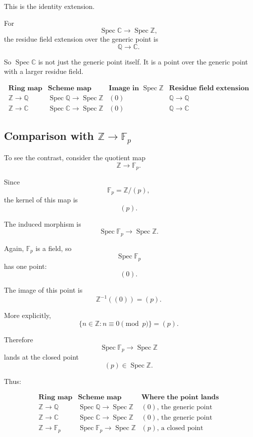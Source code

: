 \documentclass[12pt,a4paper]{article}
\DeclareMathOperator{\Spec}{Spec}
\theoremstyle{notespace}
\begin{document}
This is the identity extension.

For
\[
\Spec\mathbb C\to \Spec\mathbb Z,
\]
the residue field extension over the generic point is
\[
\mathbb Q\to \mathbb C.
\]

So \(\Spec\mathbb C\) is not just the generic point itself. It is a point over the generic point with a larger residue field.

\[
\begin{array}{c|c|c|c}
	\textbf{Ring map}
	&
	\textbf{Scheme map}
	&
	\textbf{Image in }\Spec\mathbb Z
	&
	\textbf{Residue field extension}
	\\
	\hline
	\mathbb Z\to \mathbb Q
	&
	\Spec\mathbb Q\to \Spec\mathbb Z
	&
	(0)
	&
	\mathbb Q\to \mathbb Q
	\\[5pt]
	\mathbb Z\to \mathbb C
	&
	\Spec\mathbb C\to \Spec\mathbb Z
	&
	(0)
	&
	\mathbb Q\to \mathbb C
\end{array}
\]

\subsection{Comparison with \texorpdfstring{\(\mathbb Z\to \mathbb F_p\)}{Z to Fp}}

To see the contrast, consider the quotient map
\[
\mathbb Z\to \mathbb F_p.
\]

Since
\[
\mathbb F_p=\mathbb Z/(p),
\]
the kernel of this map is
\[
(p).
\]

The induced morphism is
\[
\Spec\mathbb F_p\to \Spec\mathbb Z.
\]

Again, \(\mathbb F_p\) is a field, so
\[
\Spec\mathbb F_p
\]
has one point:
\[
(0).
\]

The image of this point is
\[
\mathbb Z^{-1}((0))=(p).
\]

More explicitly,
\[
\{n\in\mathbb Z:n\equiv 0\pmod p\}=(p).
\]

Therefore
\[
\Spec\mathbb F_p\to \Spec\mathbb Z
\]
lands at the closed point
\[
(p)\in\Spec\mathbb Z.
\]

Thus:

\[
\begin{array}{c|c|c}
	\textbf{Ring map}
	&
	\textbf{Scheme map}
	&
	\textbf{Where the point lands}
	\\
	\hline
	\mathbb Z\to \mathbb Q
	&
	\Spec\mathbb Q\to \Spec\mathbb Z
	&
	(0)\text{, the generic point}
	\\[5pt]
	\mathbb Z\to \mathbb C
	&
	\Spec\mathbb C\to \Spec\mathbb Z
	&
	(0)\text{, the generic point}
	\\[5pt]
	\mathbb Z\to \mathbb F_p
	&
	\Spec\mathbb F_p\to \Spec\mathbb Z
	&
	(p)\text{, a closed point}
\end{array}
\]
\end{document}
